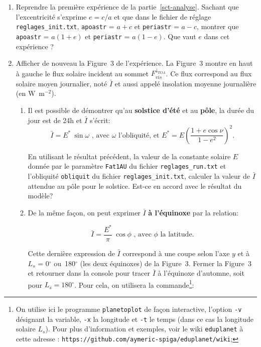 \documentclass[a4paper,12pt]{article}
\begin{document}
\begin{enumerate}
\item Reprendre la première expérience de la partie~\ref{sct-analyse}. Sachant
que l'excentricité s'exprime $e=c/a$ et que dans le fichier de réglage \texttt
{reglages\_init.txt}, \texttt{apoastr} = $a+c$ et \texttt{periastr} = $a-c$,
montrer que \texttt{apoastr} = $a(1+e)$ et \texttt{periastr} = $a(1-e)$. Que
vaut $e$ dans cet expérience ?

\item Afficher de nouveau la Figure~3 de l'expérience. La Figure~3 montre en
haut à gauche le flux solaire incident au sommet $F_{vis}^{\downarrow_{TOA}}$.
Ce flux correspond au flux solaire moyen journalier, noté $\bar{I}$ et aussi
appelé insolation moyenne journalière (en W~m$^{-2}$).

\begin{enumerate}
\item Il est possible de démontrer qu'au \textbf{solstice d'été} et au \textbf
{pôle}, la durée du jour est de 24h et $\bar{I}$ s'écrit:
\begin{equation}
\bar{I} = E^\ast \ \sin \omega \text{ , avec } \omega \text{ l'obliquité, et }
E^\ast = E \left(\frac{1+e \cos \nu}{1-e^2} \right)^2.
\end{equation}

En utilisant le résultat précédent, la valeur de la constante solaire $E$
donnée par le paramètre \texttt{Fat1AU} du fichier \texttt{reglages\_run.txt}
et l'obliquité \texttt{obliquit} du fichier \texttt{reglages\_init.txt},
calculer la valeur de $\bar{I}$ attendue au pôle pour le solstice. Est-ce en
accord avec le résultat du modèle?

\item De la même façon, on peut exprimer $\bar{I}$ \textbf{à l'équinoxe} par la
relation:

\begin{equation}
\bar{I}=\frac{E^\ast}{\pi} \ \cos \phi \text{ , avec } \phi \text{ la
latitude.}
\label{eqn-equi}
\end{equation}

Cette dernière expression de $\bar{I}$ correspond à une coupe selon l'axe $y$
et à $L_s$ = 0$^\circ$ ou~180$^\circ$ (les deux équinoxes) de la Figure~3.
Fermer la Figure~3 et retourner dans la console pour tracer $\bar{I}$ à
l'équinoxe d'automne, soit pour $L_s = 180^\circ$. Pour cela, on utilisera la
commande\footnote{On utilise ici le programme \texttt{planetoplot} de façon
interactive, l'option \texttt{-v} désignant la variable, \texttt{-x} la
longitude et \texttt{-t} le temps (dans ce cas la longitude solaire $L_s$).
Pour plus d'information et exemples, voir le wiki \texttt{eduplanet} à cette
adresse : \texttt{https://github.com/aymeric-spiga/eduplanet/wiki};}:


\end{enumerate}
\end{enumerate}
\end{document}
